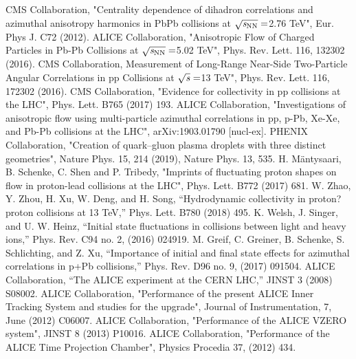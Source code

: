 %
CMS Collaboration, "Centrality dependence of dihadron correlations and azimuthal anisotropy harmonics in PbPb collisions at  $\sqrt{\it{s_{\rm{NN}}}} = $2.76 TeV",   Eur. Phys J. C72 (2012).
ALICE Collaboration, "Anisotropic Flow of Charged Particles in Pb-Pb Collisions at $\sqrt{\it{s_{\rm{NN}}}} = $5.02 TeV",  Phys. Rev. Lett. 116, 132302 (2016).
CMS Collaboration, Measurement of Long-Range Near-Side Two-Particle Angular Correlations in pp Collisions at $\sqrt{\it{s}} = $13 TeV", Phys. Rev. Lett. 116, 172302 (2016).
CMS Collaboration, "Evidence for collectivity in pp collisions at the LHC", Phys. Lett. B765 (2017) 193.
ALICE Collaboration, "Investigations of anisotropic flow using multi-particle azimuthal correlations in pp, p-Pb, Xe-Xe, and Pb-Pb collisions at the LHC", arXiv:1903.01790 [nucl-ex].
PHENIX Collaboration, "Creation of quark–gluon plasma droplets with three distinct geometries", Nature Phys. 15, 214 (2019), Nature Phys. 13, 535.
H. Mäntysaari, B. Schenke, C. Shen and P. Tribedy, "Imprints of fluctuating proton shapes on flow in proton-lead collisions at the LHC", Phys. Lett. B772 (2017) 681.
W. Zhao, Y. Zhou, H. Xu, W. Deng, and H. Song, “Hydrodynamic collectivity in proton?proton collisions at 13 TeV,” Phys. Lett. B780 (2018) 495.
K. Welsh, J. Singer, and U. W. Heinz, “Initial state fluctuations in collisions between light and heavy ions,” Phys. Rev. C94 no. 2, (2016) 024919.
M. Greif, C. Greiner, B. Schenke, S. Schlichting, and Z. Xu, “Importance of initial and final state effects for azimuthal correlations in p+Pb collisions,” Phys. Rev. D96 no. 9, (2017) 091504.
ALICE Collaboration, “The ALICE experiment at the CERN LHC,” JINST 3 (2008) S08002.
ALICE Collaboration, "Performance of the present ALICE Inner Tracking System and studies for the upgrade",  Journal of Instrumentation, 7, June (2012) C06007.
ALICE Collaboration, "Performance of the ALICE VZERO system", JINST 8 (2013) P10016.
ALICE Collaboration, "Performance of the ALICE Time Projection Chamber", Physics Procedia 37, (2012) 434.


